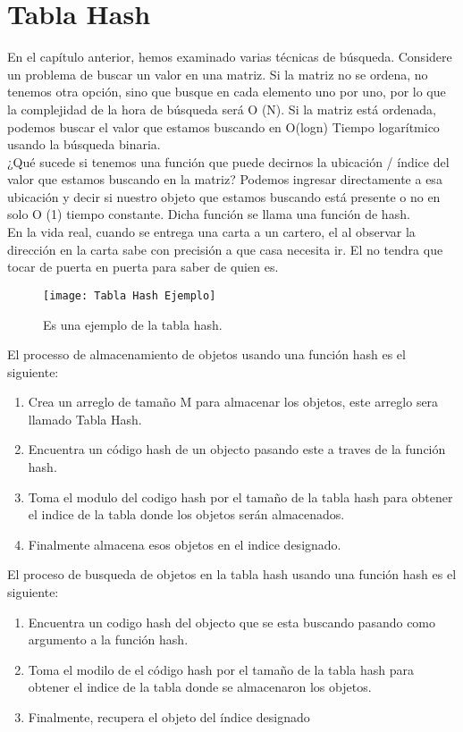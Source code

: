 \documentclass[../Book.tex]{subfiles}
\begin{document}
\chapter{Tabla Hash}
En el capítulo anterior, hemos examinado varias técnicas de búsqueda. Considere un problema de buscar un valor en una matriz. Si la matriz no se ordena, no tenemos otra opción, sino que busque en cada elemento uno por uno, por lo que la complejidad de la hora de búsqueda será O (N). Si la matriz está ordenada, podemos buscar el valor que estamos buscando en O(logn) Tiempo logarítmico usando la búsqueda binaria.	
\\
¿Qué sucede si tenemos una función que puede decirnos la ubicación / índice del valor que estamos buscando en la matriz?
Podemos ingresar directamente a esa ubicación y decir si nuestro objeto que estamos buscando está presente o no en solo O (1) tiempo constante. Dicha función se llama una función de hash.
\\
En la vida real, cuando se entrega una carta a un cartero, el al  observar la dirección en la carta sabe con precisión a que casa necesita ir. El no tendra que tocar de puerta en puerta para saber de quien es.
\begin{figure}[htb]
\texttt{[image: Tabla Hash Ejemplo]}	
\caption{\label{fig:TablaHashEjemplo} Es una ejemplo de la tabla hash.}
\end{figure}
El processo de almacenamiento de objetos usando una función hash es el siguiente:
\begin{enumerate}
\item Crea un arreglo de tamaño M para almacenar los objetos, este arreglo sera llamado Tabla Hash.
\item Encuentra un código hash de un objecto pasando este a traves de la función hash.
\item Toma el modulo del codigo hash por el tamaño de la tabla hash para obtener el indice de la tabla donde los objetos serán almacenados.
\item Finalmente almacena esos objetos en el indice designado.  
\end{enumerate}

El proceso de busqueda de objetos en la tabla hash usando una función hash es el siguiente:

\begin{enumerate}
\item Encuentra un codigo hash del objecto que se esta buscando pasando como argumento a la función hash.
\item Toma el modilo de el código hash por el tamaño de la tabla hash para obtener el indice de la tabla donde se almacenaron los objetos.
\item  Finalmente,  recupera el objeto del índice designado
\end{enumerate}
\end{document}
